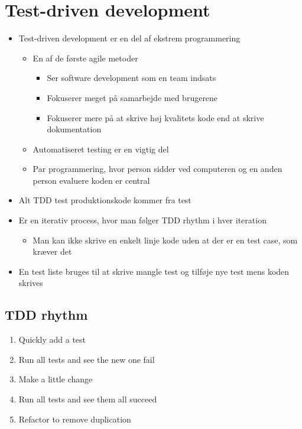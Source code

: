 \documentclass[a4, english]{article}
\begin{document}
\maketitle

\newpage    
\tableofcontents
\newpage

\section{Test-driven development}
\begin{itemize}
  \item Test-driven development er en del af ekstrem programmering
  \begin{itemize}
    \item En af de første agile metoder 
    \begin{itemize}
      \item Ser software development som en team indsats 
      \item Fokuserer meget på samarbejde med brugerene 
      \item Fokuserer mere på at skrive høj kvalitets kode end at skrive dokumentation
    \end{itemize}
    \item Automatiseret testing er en vigtig del 
    \item Par programmering, hvor person sidder ved computeren og en anden person evaluere koden er central
  \end{itemize}
  \item Alt TDD test produktionskode kommer fra test
  \item Er en iterativ process, hvor man følger TDD rhythm i hver iteration
  \begin{itemize}
    \item Man kan ikke skrive en enkelt linje kode uden at der er en test case, som kræver det
  \end{itemize}
  \item En test liste bruges til at skrive mangle test og tilføje nye test mens koden skrives
\end{itemize}


\subsection{TDD rhythm}
\begin{enumerate}
  \item Quickly add a test
  \item Run all tests and see the new one fail
  \item Make a little change
  \item Run all tests and see them all succeed 
  \item Refactor to remove duplication
\end{enumerate}
\end{document}
